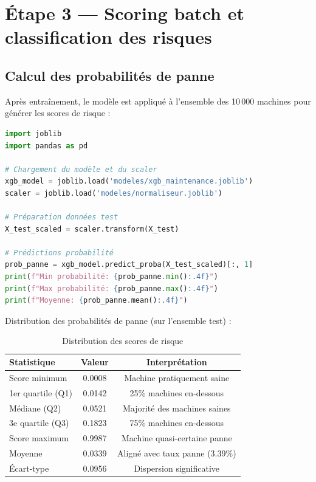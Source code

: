 \documentclass[a4paper,12pt]{report}
\begin{document}
\section{Étape 3 — Scoring batch et classification des risques}

\subsection{Calcul des probabilités de panne}

Après entraînement, le modèle est appliqué à l'ensemble des 10\,000 machines pour générer les scores de risque :

\begin{lstlisting}[language=Python]
import joblib
import pandas as pd

# Chargement du modèle et du scaler
xgb_model = joblib.load('modeles/xgb_maintenance.joblib')
scaler = joblib.load('modeles/normaliseur.joblib')

# Préparation données test
X_test_scaled = scaler.transform(X_test)

# Prédictions probabilité
prob_panne = xgb_model.predict_proba(X_test_scaled)[:, 1]
print(f"Min probabilité: {prob_panne.min():.4f}")
print(f"Max probabilité: {prob_panne.max():.4f}")
print(f"Moyenne: {prob_panne.mean():.4f}")
\end{lstlisting}

Distribution des probabilités de panne (sur l'ensemble test) :

\begin{table}[H]
\centering
\small
\caption{Distribution des scores de risque}
\begin{tabular}{|l|c|c|}
\hline
\textbf{Statistique} & \textbf{Valeur} & \textbf{Interprétation} \\
\hline\hline
Score minimum & 0.0008 & Machine pratiquement saine \\
\hline
1er quartile (Q1) & 0.0142 & 25\% machines en-dessous \\
\hline
Médiane (Q2) & 0.0521 & Majorité des machines saines \\
\hline
3e quartile (Q3) & 0.1823 & 75\% machines en-dessous \\
\hline
Score maximum & 0.9987 & Machine quasi-certaine panne \\
\hline
Moyenne & 0.0339 & Aligné avec taux panne (3.39\%) \\
\hline
Écart-type & 0.0956 & Dispersion significative \\
\hline
\end{tabular}
\end{table}
\end{document}

